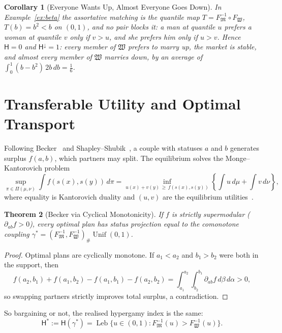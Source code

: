 \documentclass[11pt]{article}
\let\oldsection\section
\renewcommand{\section}{\Needspace{0.25\textheight}\oldsection}
\newtheorem{theorem}{Theorem}[section]
\newtheorem{corollary}[theorem]{Corollary}
\theoremstyle{definition}
\theoremstyle{remark}
\newcommand{\M}{\mathfrak{M}}
\newcommand{\W}{\mathfrak{W}}
\newcommand{\Hy}{\mathsf{H}}
\DeclareMathOperator{\Unif}{Unif}
\DeclareMathOperator{\Leb}{Leb}
\begin{document}
\begin{corollary}[Everyone Wants Up, Almost Everyone Goes Down]
  In Example~\ref{ex:beta} the assortative matching is the quantile
  map $T = F_\M^{-1}\circ F_\W$, $T(b) = b^2 < b$ on $(0,1)$, and no
  pair blocks it: a man at quantile $u$ prefers a woman at quantile $v$
  only if $v > u$, and she prefers him only if $u > v$. Hence $\Hy = 0$
  and $\Hy^{\downarrow} = 1$: every member of $\W$ prefers to marry up,
  the market is stable, and almost every member of $\W$ marries down,
  by an average of $\int_0^1 (b-b^2)\,2b\,db = \frac16$.
\end{corollary}

\section{Transferable Utility and Optimal Transport}

Following Becker~\cite{becker} and Shapley--Shubik~\cite{shapley}, a
couple with statuses $a$ and $b$ generates surplus $f(a,b)$, which
partners may split. The equilibrium solves the Monge--Kantorovich
problem
\begin{equation}\label{eq:mk}
  \sup_{\pi\in\Pi(\mu,\nu)} \int f(s(x),s(y))\,d\pi =
  \inf_{u(x)+v(y)\,\ge\,f(s(x),s(y))}
  \left\{\int u\,d\mu + \int v\,d\nu\right\},
\end{equation}
where equality is Kantorovich duality and $(u,v)$ are the equilibrium
utilities~\cite{villani}.

\begin{theorem}[Becker via Cyclical Monotonicity]\label{thm:becker}
  If $f$ is strictly supermodular ($\partial_{ab}f > 0$), every
  optimal plan has status projection equal to the comonotone coupling
  $\gamma^* = (F_\M^{-1},F_\W^{-1})_\#\Unif(0,1)$.
\end{theorem}

\begin{proof}
  Optimal plans are cyclically monotone. If $a_1 < a_2$ and $b_1 >
  b_2$ were both in the support, then
  \begin{equation}
    f(a_2,b_1) + f(a_1,b_2) - f(a_1,b_1) - f(a_2,b_2) =
    \int_{a_1}^{a_2}\!\int_{b_2}^{b_1} \partial_{ab}f\,d\beta\,d\alpha > 0,
  \end{equation}
  so swapping partners strictly improves total surplus, a contradiction.
\end{proof}

So bargaining or not, the realised hypergamy index is the same:
\begin{equation}\label{eq:index}
  \Hy^* := \Hy(\gamma^*) = \Leb\{u\in(0,1) : F_\M^{-1}(u) > F_\W^{-1}(u)\}.
\end{equation}
\end{document}

